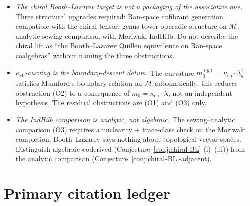 \documentclass[11pt]{amsart}
\newcommand{\kch}{\kappa_{\mathrm{ch}}}
\newcommand{\cM}{\mathcal{M}}
\newcommand{\Mbar}{\overline{\cM}}
\begin{document}
\begin{itemize}
\item[AP-CY\#.] \emph{The chiral Booth--Lazarev target is not a
packaging of the associative one.} Three structural upgrades
required: Ran-space cofibrant generation compatible with the chiral
tensor; genus-tower operadic structure on $\Mbar$; analytic sewing
comparison with Moriwaki IndHilb. Do not describe the chiral lift
as ``the Booth--Lazarev Quillen equivalence on Ran-space coalgebras''
without naming the three obstructions.
\item[AP-CY\#.] \emph{$\kch$-curving is the boundary-descent datum.}
The curvature $m_0^{(g)}=\kch\cdot\lambda_g^{1}$ satisfies Mumford's
boundary relation on $\Mbar$ automatically; this reduces
obstruction (O2) to a consequence of
$m_0=\kch\cdot\lambda$, not an independent hypothesis. The
residual obstructions are (O1) and (O3) only.
\item[AP-CY\#.] \emph{The IndHilb comparison is analytic, not
algebraic.} The sewing--analytic comparison (O3) requires a
nuclearity + trace-class check on the Moriwaki completion;
Booth--Lazarev says nothing about topological vector spaces.
Distinguish algebraic coderived (Conjecture~\ref{conj:chiral-BL}
(i)--(iii)) from the analytic comparison
(Conjecture~\ref{conj:chiral-BL}-adjacent).
\end{itemize}

\section*{Primary citation ledger}
\end{document}
